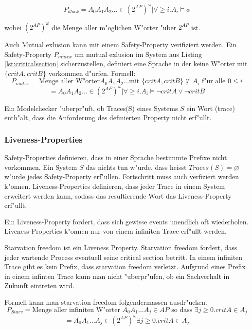 \documentclass[a4paper, twoside]{article}
\begin{document}
\[
P_{dlock} = {A_0 A_1 A_2 \dots \in (2^{AP})^{\omega} | \forall \geq i.   A_i \models \phi}
\]

wobei $(2^{AP})^{\omega}$ die Menge aller m"oglichen W"orter "uber $2^{AP}$ ist.

Auch Mutual exlusion kann mit einem Safety-Property verifiziert werden. Ein Safety-Property $P_{mutex}$ um mutual exlusion im System aus Listing \ref{lst:criticalsection} sicherzustellen, definiert eine Sprache in der keine W"orter mit $\{critA,critB\}$ vorkommen d"urfen. Formell:
\[
P_{mutex} = \text{Menge aller W"orter} A_0 A_1 A_2 \dots \text{mit } \{critA,critB\} \not \subseteq A_i \text{ f"ur alle } 0 \leq i
\]
\[
 = {A_0 A_1 A_2 \dots \in (2^{AP})^{\omega} | \forall \geq i.   A_i \models \neg critA \lor \neg critB}
\]

Ein Modelchecker "uberpr"uft, ob Traces(S) eines Systems $S$ ein Wort (trace) enth"alt, dass die Anforderung des definierten Property nicht erf"ullt.

\subsubsection{Liveness-Properties}
\label{sec:liveness}

Safety-Properties definieren, dass in einer Sprache bestimmte Prefixe nicht vorkommen. Ein System $S$ das nichts tun w"urde, dass heisst $Traces(S)=\varnothing$ w"urde jedes Safety-Property erf"ullen. Fortschritt muss auch verfiziert werden k"onnen. Liveness-Properties definieren, dass jeder Trace in einem System erweitert werden kann, sodass das resultierende Wort das Liveness-Property erf"ullt.

Ein Liveness-Property fordert, dass sich gewisse events unendlich oft wiederholen. Liveness-Properties k"onnen nur von einem infiniten Trace erf"ullt werden. 

Starvation freedom ist ein Liveness Property. Starvation freedom fordert, dass jeder wartende Process eventuell seine critical section betritt. In einem infiniten Trace gibt es kein Prefix, dass starvation freedom verletzt. Aufgrund eines Prefix in einem infinten Trace kann man nicht "uberpr"ufen, ob ein Sachverhalt in Zukunft eintreten wird.

Formell kann man starvation freedom folgendermassen ausdr"ucken.
\[
P_{Starv} = \text{Menge aller infiniten W"orter } A_0 A_1 \dots A_j \in AP \text{ so dass }\exists j \geq 0. critA \in A_j
\]
\[
 = { A_0 A_1 \dots A_j \in (2^{AP})^{\omega} \exists j \geq 0. critA \in A_j}
\]
\end{document}

